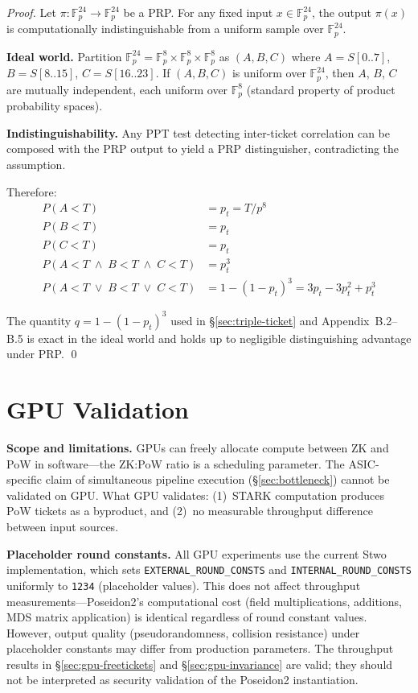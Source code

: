 \documentclass[11pt,a4paper]{article}
\begin{document}
\begin{proof}
Let $\pi: \mathbb{F}_p^{24} \to \mathbb{F}_p^{24}$ be a PRP. For any fixed input $x \in \mathbb{F}_p^{24}$, the output $\pi(x)$ is computationally indistinguishable from a uniform sample over $\mathbb{F}_p^{24}$.

\textbf{Ideal world.} Partition $\mathbb{F}_p^{24} = \mathbb{F}_p^8 \times \mathbb{F}_p^8 \times \mathbb{F}_p^8$ as $(A, B, C)$ where $A = S[0..7]$, $B = S[8..15]$, $C = S[16..23]$. If $(A, B, C)$ is uniform over $\mathbb{F}_p^{24}$, then $A$, $B$, $C$ are mutually independent, each uniform over $\mathbb{F}_p^8$ (standard property of product probability spaces).

\textbf{Indistinguishability.} Any PPT test detecting inter-ticket correlation can be composed with the PRP output to yield a PRP distinguisher, contradicting the assumption.

Therefore:
\begin{align*}
P(A < T) &= p_t = T/p^8 \\
P(B < T) &= p_t \\
P(C < T) &= p_t \\
P(A < T \;\wedge\; B < T \;\wedge\; C < T) &= p_t^3 \\
P(A < T \;\vee\; B < T \;\vee\; C < T) &= 1 - (1-p_t)^3 = 3p_t - 3p_t^2 + p_t^3
\end{align*}

The quantity $q = 1 - (1-p_t)^3$ used in \S\ref{sec:triple-ticket} and Appendix~B.2--B.5 is exact in the ideal world and holds up to negligible distinguishing advantage under PRP. \qed
\end{proof}

\section{GPU Validation}
\label{app:gpu}

\textbf{Scope and limitations.} GPUs can freely allocate compute between ZK and PoW in software---the ZK:PoW ratio is a scheduling parameter. The ASIC-specific claim of simultaneous pipeline execution (\S\ref{sec:bottleneck}) cannot be validated on GPU. What GPU validates: (1)~STARK computation produces PoW tickets as a byproduct, and (2)~no measurable throughput difference between input sources.

\textbf{Placeholder round constants.} All GPU experiments use the current Stwo implementation, which sets \texttt{EXTERNAL\_ROUND\_CONSTS} and \texttt{INTERNAL\_ROUND\_CONSTS} uniformly to \texttt{1234} (placeholder values). This does not affect throughput measurements---Poseidon2's computational cost (field multiplications, additions, MDS matrix application) is identical regardless of round constant values. However, output quality (pseudorandomness, collision resistance) under placeholder constants may differ from production parameters. The throughput results in \S\ref{sec:gpu-freetickets} and \S\ref{sec:gpu-invariance} are valid; they should not be interpreted as security validation of the Poseidon2 instantiation.
\end{document}
